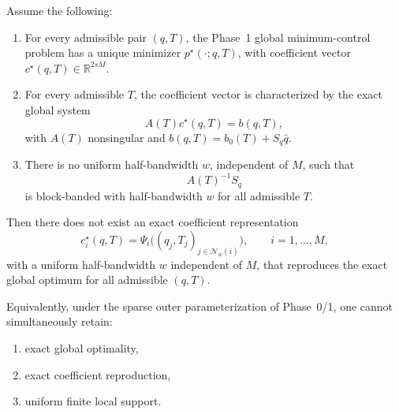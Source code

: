 \begin{theorem}
\label{thm:phase2_strong_impossibility}
Assume the following:

\begin{enumerate}
    \item For every admissible pair \((q,T)\), the Phase~1 global minimum-control problem has a unique minimizer \(p^\star(\cdot;q,T)\), with coefficient vector \(c^\star(q,T)\in\mathbb R^{2sM}\).

    \item For every admissible \(T\), the coefficient vector is characterized by the exact global system
    \[
    A(T)c^\star(q,T)=b(q,T),
    \]
    with \(A(T)\) nonsingular and \(b(q,T)=b_0(T)+S_q\bar q\).

    \item There is no uniform half-bandwidth \(w\), independent of \(M\), such that
    \[
    A(T)^{-1}S_q
    \]
    is block-banded with half-bandwidth \(w\) for all admissible \(T\).
\end{enumerate}

Then there does not exist an exact coefficient representation
\begin{equation}
\label{eq:phase2_hypothetical_local_representation}
c_i^\star(q,T)
=
\Psi_i\!\bigl((q_j,T_j)_{j\in \mathcal N_w(i)}\bigr),
\qquad i=1,\dots,M,
\end{equation}
with a uniform half-bandwidth \(w\) independent of \(M\), that reproduces the exact global optimum for all admissible \((q,T)\).

Equivalently, under the sparse outer parameterization of Phase~0/1, one cannot simultaneously retain:

\begin{enumerate}
    \item exact global optimality,
    \item exact coefficient reproduction,
    \item uniform finite local support.
\end{enumerate}
\end{theorem}

